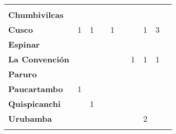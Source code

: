 \begin{tabular}{lccccccccc}
	&\cellcolor[HTML]{FCC46C}					\\
	\textbf{Chumbivilcas}                      												
	&\cellcolor[HTML]{FCC46C}
	&\cellcolor[HTML]{FCC46C}					&\cellcolor[HTML]{FCC46C}
	&\cellcolor[HTML]{FCC46C}					&\cellcolor[HTML]{FCC46C}
	&\cellcolor[HTML]{FCC46C}					&\cellcolor[HTML]{FCC46C}
	&\cellcolor[HTML]{FCC46C}					&\cellcolor[HTML]{FCC46C}\\
	\textbf{Cusco}                            									
	&1											&1
	&\cellcolor[HTML]{FCC46C}					&1
	&\cellcolor[HTML]{FCC46C}					&\cellcolor[HTML]{FCC46C}
	&1											&3
	&\cellcolor[HTML]{FCC46C}\\
	\textbf{Espinar}       					             									&\cellcolor[HTML]{FCC46C}
	&\cellcolor[HTML]{FCC46C}					&\cellcolor[HTML]{FCC46C}
	&\cellcolor[HTML]{FCC46C}					&\cellcolor[HTML]{FCC46C}
	&\cellcolor[HTML]{FCC46C}					&\cellcolor[HTML]{FCC46C}
	&\cellcolor[HTML]{FCC46C}					&\cellcolor[HTML]{FCC46C}\\
	\textbf{La Convención}                      					
	&\cellcolor[HTML]{FCC46C} 
	&\cellcolor[HTML]{FCC46C}					&\cellcolor[HTML]{FCC46C}
	&\cellcolor[HTML]{FCC46C}					&\cellcolor[HTML]{FCC46C}
	&1											&1
	&1											&\cellcolor[HTML]{FCC46C}\\
	\textbf{Paruro}                            					
	&\cellcolor[HTML]{FCC46C}					&\cellcolor[HTML]{FCC46C}					&\cellcolor[HTML]{FCC46C}					&\cellcolor[HTML]{FCC46C}					&\cellcolor[HTML]{FCC46C}					&\cellcolor[HTML]{FCC46C}
	&\cellcolor[HTML]{FCC46C} 					&\cellcolor[HTML]{FCC46C}
	&\cellcolor[HTML]{FCC46C}\\
	\textbf{Paucartambo}               		                       			
	&1							
	&\cellcolor[HTML]{FCC46C}					&\cellcolor[HTML]{FCC46C}
	&\cellcolor[HTML]{FCC46C}					&\cellcolor[HTML]{FCC46C}
	&\cellcolor[HTML]{FCC46C}					&\cellcolor[HTML]{FCC46C}
	&\cellcolor[HTML]{FCC46C}					&\cellcolor[HTML]{FCC46C}\\
	\textbf{Quispicanchi}                                         	      					
	&\cellcolor[HTML]{FCC46C}
	&1											&\cellcolor[HTML]{FCC46C}
	&\cellcolor[HTML]{FCC46C}					&\cellcolor[HTML]{FCC46C}
	&\cellcolor[HTML]{FCC46C}					&\cellcolor[HTML]{FCC46C}
	&\cellcolor[HTML]{FCC46C}					&\cellcolor[HTML]{FCC46C}\\
	\textbf{Urubamba}                                                      	
	&\cellcolor[HTML]{FCC46C}					&\cellcolor[HTML]{FCC46C}					&\cellcolor[HTML]{FCC46C}					&\cellcolor[HTML]{FCC46C}					&\cellcolor[HTML]{FCC46C}					&\cellcolor[HTML]{FCC46C}					&2											&\cellcolor[HTML]{FCC46C}
	&\cellcolor[HTML]{FCC46C}\\	
	&\multicolumn{1}{l}{}                       &\multicolumn{1}{l}{}            &\multicolumn{1}{l}{}                         
	&\multicolumn{1}{l}{}                       &\multicolumn{1}{l}{}            &\multicolumn{1}{l}{}                       &\multicolumn{1}{l}{}                       &\multicolumn{1}{l}{}            			&\multicolumn{1}{l}{}    
\end{tabular}